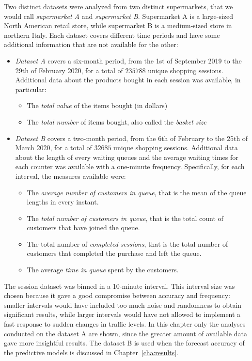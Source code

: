 Two distinct datasets were analyzed from two distinct supermarkets, that we would call \emph{supermarket A} and \emph{supermarket B}. Supermarket A is a large-sized North American retail store, while supermarket B is a medium-sized store in northern Italy. Each dataset covers different time periods and have some additional information that are not available for the other:
\begin{itemize}
  \item \emph{Dataset A} covers a six-month period, from the 1st of September 2019 to the 29th of February 2020, for a total of \( 235788 \) unique shopping sessions. Additional data about the products bought in each session was available, in particular:
        \begin{itemize}
          \item The \emph{total value} of the items bought (in dollars)
          \item The \emph{total number} of items bought, also called the \emph{basket size}
        \end{itemize}
  \item \emph{Dataset B} covers a two-month period, from the 6th of February to the 25th of March 2020, for a total of \( 32685 \) unique shopping sessions. Additional data about the length of every waiting queues and the average waiting times for each counter was available with a one-minute frequency. Specifically, for each interval, the measures available were:
        \begin{itemize}
          \item The \emph{average number of customers in queue}, that is the mean of the queue lengths in every instant.
          \item The \emph{total number of customers in queue}, that is the total count of customers that have joined the queue.
          \item The total number of \emph{completed sessions}, that is the total number of customers that completed the purchase and left the queue.
          \item The average \emph{time in queue} spent by the customers.
        \end{itemize}
\end{itemize}

The session dataset was binned in a 10-minute interval. This interval size was chosen because it gave a good compromise between accuracy and frequency: smaller intervals would have included too much noise and randomness to obtain significant results, while larger intervals would have not allowed to implement a fast response to sudden changes in traffic levels. In this chapter only the analyses conducted on the dataset A are shown, since the greater amount of available data gave more insightful results. The dataset B is used when the forecast accuracy of the predictive models is discussed in Chapter~\ref{cha:results}.

